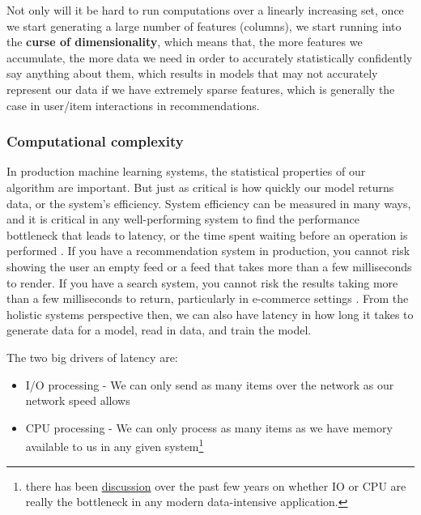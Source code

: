 \documentclass[11pt, table]{diazessay} %
\begin{document}
\begin{sloppypar}
\begin{table}[H]
\end{table}

Not only will it be hard to run computations over a linearly increasing set, once we start generating a large number of features (columns), we start running into the \textbf{curse of dimensionality}, which means that, the more features we accumulate, the more data we need in order to accurately statistically confidently say anything about them, which results in models that may not accurately represent our data \citep{houle2010can} if we have extremely sparse features, which is generally the case in user/item interactions in recommendations.   

\subsubsection{Computational complexity}
 
In production machine learning systems, the statistical properties of our algorithm are important. But just as critical is how quickly our model returns data, or the system's efficiency. System efficiency can be measured in many ways, and it is critical in any well-performing system to find the performance bottleneck that leads to latency, or the time spent waiting before an operation is  performed \citep{gregg2014systems}. If you have a recommendation system in production, you cannot risk showing the user an empty feed or a feed that takes more than a few milliseconds to render. If you have a search system, you cannot risk the results taking more than a few milliseconds to return, particularly in e-commerce settings \cite{arapakis2014impact}.  From the holistic systems perspective then, we can also have latency in how long it takes to generate data for a model, read in data, and train the model.

The two big drivers of latency are:

\begin{itemize}
  \item I/O processing - We can only send as many items over the network as our network speed allows
  \item CPU processing - We can only process as many items as we have memory available to us in any given system\footnote{there has been \href{https://benhoyt.com/writings/io-is-no-longer-the-bottleneck/}{discussion} over the past few years on whether IO or CPU are really the bottleneck in any modern data-intensive application.}
\end{itemize}



\end{sloppypar}
\end{document}
